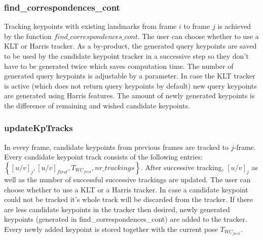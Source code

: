 \subsubsection{find\_correspondences\_cont}
Tracking keypoints with existing landmarks from frame $i$ to frame $j$ is achieved by the function $find\_correspondences\_cont$. The user can choose whether to use a KLT or Harris tracker. As a by-product, the generated query keypoints are saved to be used by the candidate keypoint tracker in a successive step so they don't have to be generated twice which saves computation time. The number of generated query keypoints is adjustable by a parameter. In case the KLT tracker is active (which does not return query keypoints by default) new query keypoints are generated using Harris features. The amount of newly generated keypoints is the difference of remaining and wished candidate keypoints.

\subsubsection{updateKpTracks}
In every frame, candidate keypoints from previous frames are tracked to $j$-frame. Every candidate keypoint track consists of the following entries: $\left\{\left[u/v\right]_j, \left[u/v\right]_{first}, T_{WC_{first}}, nr\_trackings\right\}$. After successive tracking, $[u/v]_j$ as well as the number of successful successive trackings are updated. The user can choose whether to use a KLT or a Harris tracker.
In case a candidate keypoint could not be tracked it's whole track will be discarded from the tracker. If there are less candidate keypoints in the tracker then desired, newly generated keypoints (generated in find\_correspondences\_cont) are added to the tracker. Every newly added keypoint is stored together with the current pose $T_{WC_{first}}$.

